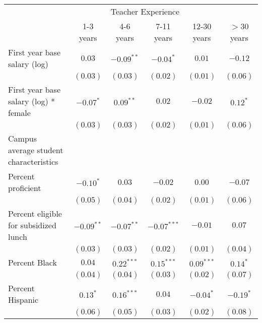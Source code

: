 \begin{table}
\begin{center}
\begin{adjustbox}{width=\textwidth,totalheight=0.85\textheight,keepaspectratio}
\begin{tabular}{l c c c c c }
\hline
 & \multicolumn{4}{c}{Teacher Experience} \\ \cline{2-6}
 & 1-3 years & 4-6 years & 7-11 years & 12-30 years & $>$30 years \\
\hline
First year base salary (log)                & $0.03$        & $-0.09^{**}$  & $-0.04^{*}$   & $0.01$       & $-0.12$     \\
                                            & $(0.03)$      & $(0.03)$      & $(0.02)$      & $(0.01)$     & $(0.06)$    \\
First year base salary (log) * female       & $-0.07^{*}$   & $0.09^{**}$   & $0.02$        & $-0.02$      & $0.12^{*}$  \\
                                            & $(0.03)$      & $(0.03)$      & $(0.02)$      & $(0.01)$     & $(0.06)$    \\
Campus average student characteristics      &               &               &               &              &             \\
\quad Percent proficient                    & $-0.10^{*}$   & $0.03$        & $-0.02$       & $0.00$       & $-0.07$     \\
                                            & $(0.05)$      & $(0.04)$      & $(0.02)$      & $(0.01)$     & $(0.06)$    \\
\quad Percent eligible for subsidized lunch & $-0.09^{**}$  & $-0.07^{**}$  & $-0.07^{***}$ & $-0.01$      & $0.07$      \\
                                            & $(0.03)$      & $(0.03)$      & $(0.02)$      & $(0.01)$     & $(0.04)$    \\
\quad Percent Black                         & $0.04$        & $0.22^{***}$  & $0.15^{***}$  & $0.09^{***}$ & $0.14^{*}$  \\
                                            & $(0.04)$      & $(0.04)$      & $(0.03)$      & $(0.02)$     & $(0.07)$    \\
\quad Percent Hispanic                      & $0.13^{*}$    & $0.16^{***}$  & $0.04$        & $-0.04^{*}$  & $-0.19^{*}$ \\
                                            & $(0.06)$      & $(0.05)$      & $(0.03)$      & $(0.02)$     & $(0.08)$    \\

\end{tabular}
\end{adjustbox}
\end{center}
\end{table}
